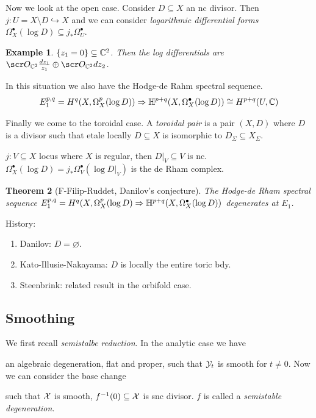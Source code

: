 \documentclass[A4paper, british, reqno]{amsart}
\theoremstyle{darkgreentheorem}
\newtheorem{thm}{Theorem}[section]
\theoremstyle{darkbluedefinition}
\theoremstyle{darkredexample}
\newtheorem{exa}[thm]{Example}
\theoremstyle{remark}
\newcommand{\1}{\mathbbm{1}}
\newcommand{\op}{\oplus}
\newcommand{\grd}{^{\bullet}}
\newcommand{\sub}{\subseteq}
\newcommand{\mono}{\hookrightarrow}
\begin{document}
Now we look at the open case.
Consider $D\sub X$ an nc divisor.
Then $j\colon U=X\setminus D\mono X$ and we can consider \textit{logarithmic differential forms} $\Omega_{X}\grd(\log{D})\sub j_{*}\Omega_{U}\grd$.

\begin{exa}
    $\{ z_{1}=0\}\sub \C^{2}$.
    Then the log differentials are $\O_{\C^{2}}\frac{dz_{1}}{z_{1}}\op \O_{\C^{2}}dz_{2}$.
\end{exa}

In this situation we also have the Hodge-de Rahm spectral sequence.
\[ E_{1}^{p,q}=H^{q}(X,\Omega_{X}^{p}(\log{D}))\Rightarrow \bbH^{p+q}(X,\Omega_{X}\grd(\log{D}))\cong H^{p+q}(U,\C) \]

Finally we come to the toroidal case.
A \textit{toroidal pair} is a pair $(X,D)$ where $D$ is a divisor such that etale locally $D\sub X$ is isomorphic to $D_{\Sigma}\sub X_{\Sigma}$.

$j\colon V\sub X$ locus where $X$ is regular, then $D|_{V}\sub V$ is nc.
$\Omega_{X}\grd(\log{D})=j_{*}\Omega_{V}\grd(\log{D|_{V}})$ is the de Rham complex.

\begin{thm}[F-Filip-Ruddet, Danilov's conjecture]
    The Hodge-de Rham spectral sequence $E_{1}^{p,q}=H^{q}(X,\Omega_{X}^{p}(\log{D})\Rightarrow \bbH^{p+q}(X,\Omega_{X}\grd(\log{D})) $ degenerates at $E_{1}$.
\end{thm}

History:
\begin{enumerate}
	\item Danilov: $D=\varnothing$.
	\item Kato-Illusie-Nakayama: $D$ is locally the entire toric bdy.
	\item Steenbrink: related result in the orbifold case.
\end{enumerate}

\subsection{Smoothing}

We first recall \textit{semistalbe reduction}.
In the analytic case we have
\begin{center}
\end{center}
an algebraic degeneration, flat and proper, such that $\mathcal{Y}_{t}$ is smooth for $t\neq 0$.
Now we can consider the base change
\begin{center}
\end{center}
such that $\mathcal{X}$ is smooth, $f^{-1}(0)\sub \X$ is snc divisor.
$f$ is called a \textit{semistable degeneration}.
\end{document}
